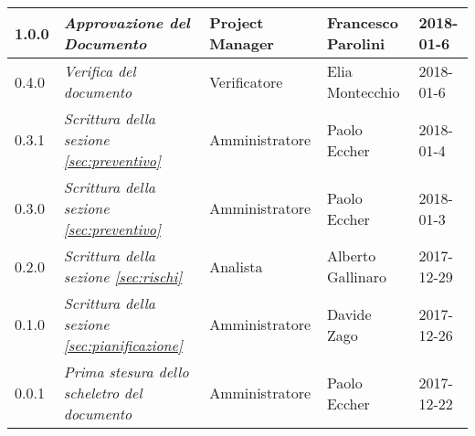 \begin{longtable}[H]{C{2cm}|C{4cm}|C{3cm}|C{3cm}|R{2cm}}
		1.0.0 &\emph{Approvazione del Documento} & Project Manager & Francesco Parolini & 2018-01-6 \\
		\hline
		
		0.4.0 &\emph{Verifica del documento} & Verificatore & Elia Montecchio & 2018-01-6 \\
		\hline
		
		0.3.1 &\emph{Scrittura della sezione \ref{sec:preventivo}} & Amministratore & Paolo Eccher  & 2018-01-4 \\
		\hline
		
		0.3.0 &\emph{Scrittura della sezione \ref{sec:preventivo}} & Amministratore & Paolo Eccher & 2018-01-3 \\
		\hline
		
		0.2.0 &\emph{Scrittura della sezione \ref{sec:rischi}} & Analista & Alberto Gallinaro & 2017-12-29 \\
		\hline
		
		0.1.0 &\emph{Scrittura della sezione \ref{sec:pianificazione}} & Amministratore & Davide Zago & 2017-12-26 \\
		\hline
		
		0.0.1 &\emph{Prima stesura dello scheletro del documento} & Amministratore & Paolo Eccher & 2017-12-22 \\
		
\end{longtable}
	

\clearpage